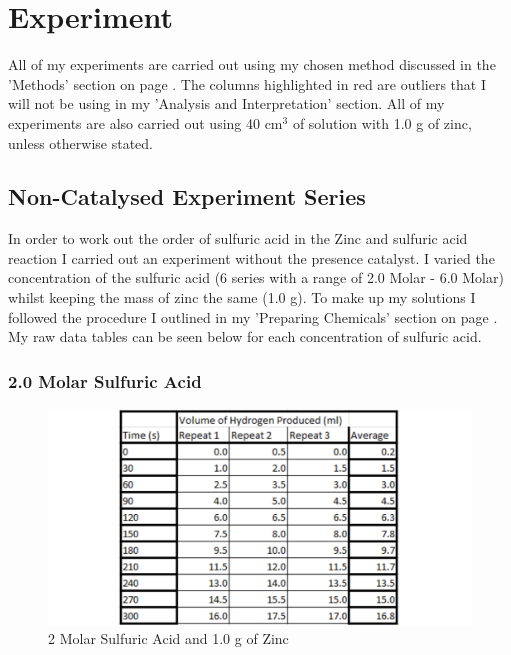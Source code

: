 \chapter {Experiment} %

All of my experiments are carried out using my chosen method discussed in the 'Methods' section on page \pageref{Chosen Method}. The columns highlighted in red are outliers that I will not be using in my 'Analysis and Interpretation' section. All of my experiments are also carried out using 40 cm$^3$ of solution with 1.0 g of zinc, unless otherwise stated.

\section{Non-Catalysed Experiment Series}

In order to work out the order of sulfuric acid in the Zinc and sulfuric acid reaction I carried out an experiment without the presence catalyst. I varied the concentration of the sulfuric acid (6 series with a range of 2.0 Molar - 6.0 Molar) whilst keeping the mass of zinc the same (1.0 g). To make up my solutions I followed the procedure I outlined in my 'Preparing Chemicals' section on page \pageref{Preparing Chemicals}. My raw data tables can be seen below for each concentration of sulfuric acid.

	\subsection{2.0 Molar Sulfuric Acid}

\begin{figure}[H]
    \includegraphics[width=\textwidth]{./Experiment/Images/1NonCatalyst/2Molar.pdf}
    \caption{2 Molar Sulfuric Acid and 1.0 g of Zinc} \label{fig:2MolarSARawData}
\end{figure}


